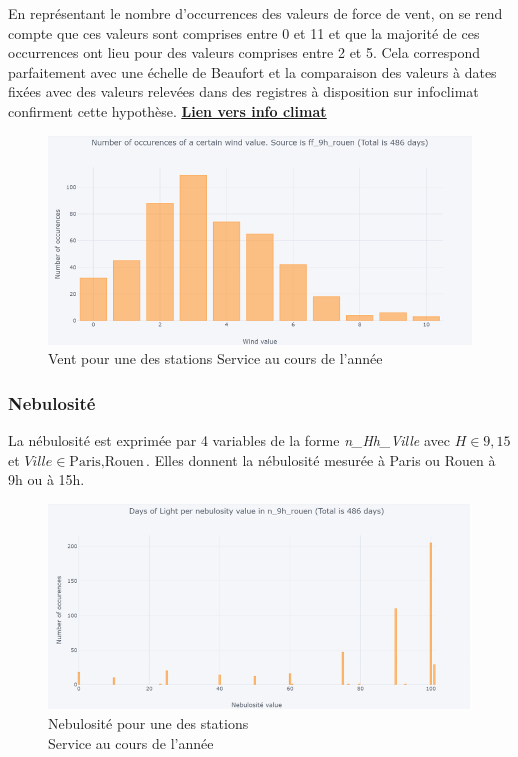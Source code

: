 \documentclass{article} %
\begin{document}
En représentant le nombre d’occurrences des valeurs de force de vent, on se rend compte que ces valeurs sont comprises entre 0 et 11 et que la majorité de ces occurrences ont lieu pour des valeurs comprises entre 2 et 5. Cela correspond parfaitement avec une échelle de Beaufort et la comparaison des valeurs à dates fixées avec des valeurs relevées dans des registres à disposition sur infoclimat confirment cette hypothèse.
\href{https://www.infoclimat.fr/observations-meteo/archives/27/janvier/2016/rouen-boos/07037.html}{\underline{\textbf{\textcolor[rgb]{0,0,1}{Lien vers info climat}}}}
\begin{figure}[!h]
	\centering
	\includegraphics[keepaspectratio = true,scale=0.55]{wind.png}
	\caption{Vent pour une des stations Service au cours de l'année}
	\label{fig:wind}
\end{figure}
\subsubsection{Nebulosité}


La nébulosité est exprimée par 4 variables de la forme \textit{n\_Hh\_Ville} avec $H \in {9,15}$ et $Ville \in {\mbox{Paris},\mbox{Rouen}}$. Elles donnent la nébulosité mesurée à Paris ou Rouen à 9h ou à 15h.\\
\begin{figure}
	\centering
	\includegraphics[keepaspectratio = true,scale=0.55]{neb.png}
	\caption[Nebulosité pour une des stations; Service au cours de l'année]{Nebulosité pour une des stations\\ Service au cours de l'année\endtabular}
	\label{fig:neb}
\end{figure}
~\\
\end{document}
